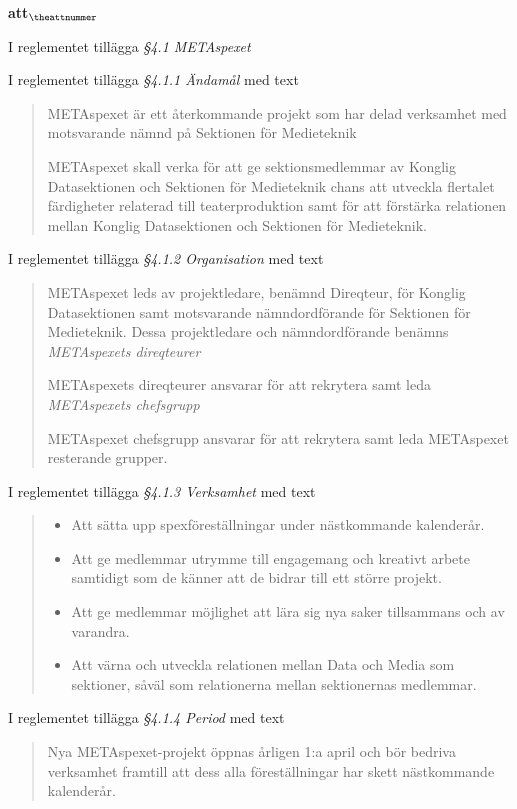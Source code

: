 \documentclass[a4paper]{article}
\begin{document}
\begin{list}{\bf att$_{\theattnummer}$}{}

\item I reglementet tillägga \textit{\S4.1 METAspexet}
\item I reglementet tillägga \textit{\S4.1.1 Ändamål} med text
    \begin{quote}
        METAspexet är ett återkommande projekt som har delad verksamhet med motsvarande nämnd på Sektionen för Medieteknik

        METAspexet skall verka för att ge sektionsmedlemmar av Konglig Datasektionen och Sektionen för Medieteknik chans att utveckla flertalet färdigheter relaterad till teaterproduktion samt för att förstärka relationen mellan Konglig Datasektionen och Sektionen för Medieteknik.
    \end{quote}
\item I reglementet tillägga \textit{\S4.1.2 Organisation} med text
    \begin{quote}
        METAspexet leds av projektledare, benämnd Direqteur, för Konglig Datasektionen samt motsvarande nämndordförande
        för Sektionen för Medieteknik. Dessa projektledare och nämndordförande benämns \textit{METAspexets direqteurer}

        METAspexets direqteurer ansvarar för att rekrytera samt leda \textit{METAspexets chefsgrupp}

        METAspexet chefsgrupp ansvarar för att rekrytera samt leda METAspexet resterande grupper.
    \end{quote}
\item I reglementet tillägga \textit{\S4.1.3 Verksamhet} med text
    \begin{quote}
        \begin{itemize}
            \item Att sätta upp spexföreställningar under nästkommande kalenderår.
            \item Att ge medlemmar utrymme till engagemang och kreativt arbete samtidigt som de känner att de bidrar till ett större projekt.
            \item Att ge medlemmar möjlighet att lära sig nya saker tillsammans och av varandra.
            \item Att värna och utveckla relationen mellan Data och Media som sektioner, såväl som relationerna mellan sektionernas medlemmar.
        \end{itemize}
    \end{quote}
\item I reglementet tillägga \textit{\S4.1.4 Period} med text
    \begin{quote} Nya METAspexet-projekt öppnas årligen 1:a april och bör bedriva verksamhet framtill att dess alla föreställningar har skett nästkommande kalenderår.


\end{quote}
\end{list}
\end{document}
